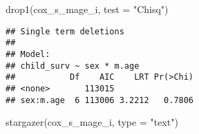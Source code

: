 \documentclass[
]{article}
\newenvironment{Shaded}{\begin{snugshade}}{\end{snugshade}}
\newcommand{\AttributeTok}[1]{\textcolor[rgb]{0.77,0.63,0.00}{#1}}
\newcommand{\FunctionTok}[1]{\textcolor[rgb]{0.00,0.00,0.00}{#1}}
\newcommand{\NormalTok}[1]{#1}
\newcommand{\StringTok}[1]{\textcolor[rgb]{0.31,0.60,0.02}{#1}}
\begin{document}
\begin{Shaded}
\begin{Highlighting}[]
\FunctionTok{drop1}\NormalTok{(cox\_s\_mage\_i, }\AttributeTok{test =} \StringTok{"Chisq"}\NormalTok{)}
\end{Highlighting}
\end{Shaded}

\begin{verbatim}
## Single term deletions
## 
## Model:
## child_surv ~ sex * m.age
##           Df    AIC    LRT Pr(>Chi)
## <none>       113015                
## sex:m.age  6 113006 3.2212   0.7806
\end{verbatim}

\begin{Shaded}
\begin{Highlighting}[]
\FunctionTok{stargazer}\NormalTok{(cox\_s\_mage\_i, }\AttributeTok{type =} \StringTok{"text"}\NormalTok{)}
\end{Highlighting}
\end{Shaded}
\end{document}
